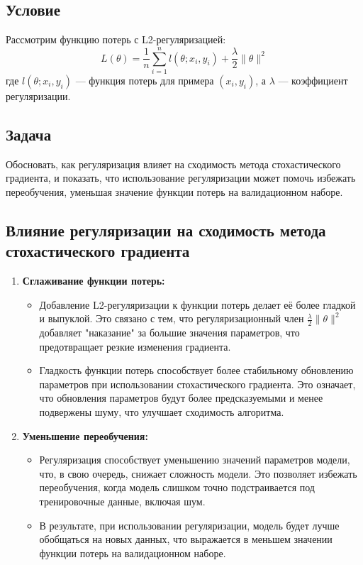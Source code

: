 \subsection*{Условие}
Рассмотрим функцию потерь с L2-регуляризацией:
$$ L(\theta) = \frac{1}{n} \sum_{i=1}^{n} l(\theta; x_i, y_i) + \frac{\lambda}{2} \|\theta\|^2 $$
где \( l(\theta; x_i, y_i) \) — функция потерь для примера \( (x_i, y_i) \), а \( \lambda \) — коэффициент регуляризации.

\subsection*{Задача}
Обосновать, как регуляризация влияет на сходимость метода стохастического градиента, и показать, что использование регуляризации может помочь избежать переобучения, уменьшая значение функции потерь на валидационном наборе.

\subsection*{Влияние регуляризации на сходимость метода стохастического градиента}
\begin{enumerate}
    \item \textbf{Сглаживание функции потерь:}
    \begin{itemize}
        \item Добавление L2-регуляризации к функции потерь делает её более гладкой и выпуклой. Это связано с тем, что регуляризационный член \( \frac{\lambda}{2} \|\theta\|^2 \) добавляет "наказание" за большие значения параметров, что предотвращает резкие изменения градиента.
        \item Гладкость функции потерь способствует более стабильному обновлению параметров при использовании стохастического градиента. Это означает, что обновления параметров будут более предсказуемыми и менее подвержены шуму, что улучшает сходимость алгоритма.
    \end{itemize}

    \item \textbf{Уменьшение переобучения:}
    \begin{itemize}
        \item Регуляризация способствует уменьшению значений параметров модели, что, в свою очередь, снижает сложность модели. Это позволяет избежать переобучения, когда модель слишком точно подстраивается под тренировочные данные, включая шум.
        \item В результате, при использовании регуляризации, модель будет лучше обобщаться на новых данных, что выражается в меньшем значении функции потерь на валидационном наборе.
    \end{itemize}
\end{enumerate}

